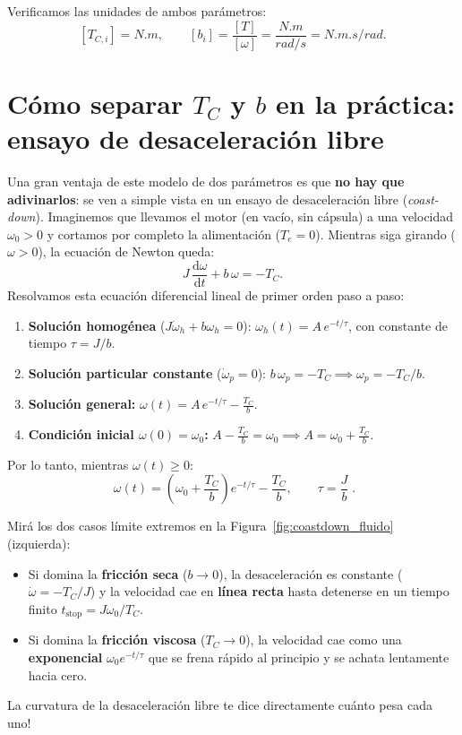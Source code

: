 \documentclass[11pt,a4paper,oneside]{book}
\newcommand{\dd}{\mathrm{d}}
\begin{document}
\begin{unidades}
Verificamos las unidades de ambos parámetros:
\[
  [T_{C,i}] = \si{N.m}, \qquad
  [b_i] = \frac{[T]}{[\omega]} = \frac{\si{N.m}}{\si{rad/s}} = \si{N.m.s/rad}.
\]
\end{unidades}

\section{Cómo separar \texorpdfstring{$T_C$ y $b$}{TC y b} en la práctica: ensayo de desaceleración libre}

Una gran ventaja de este modelo de dos parámetros es que \textbf{no hay que
adivinarlos}: se ven a simple vista en un ensayo de desaceleración libre
(\emph{coast-down}). Imaginemos que llevamos el motor (en vacío, sin cápsula) a
una velocidad $\omega_0 > 0$ y cortamos por completo la alimentación ($T_e = 0$).
Mientras siga girando ($\omega > 0$), la ecuación de Newton queda:
\begin{equation}
  J\,\frac{\dd\omega}{\dd t} + b\,\omega = -T_C.
  \label{eq:edo_coastdown}
\end{equation}
Resolvamos esta ecuación diferencial lineal de primer orden paso a paso:
\begin{enumerate}
  \item \textbf{Solución homogénea} ($J\dot\omega_h + b\omega_h = 0$):
        $\omega_h(t) = A\,e^{-t/\tau}$, con constante de tiempo $\tau = J/b$.
  \item \textbf{Solución particular constante} ($\dot\omega_p = 0$):
        $b\,\omega_p = -T_C \implies \omega_p = -T_C/b$.
  \item \textbf{Solución general:} $\omega(t) = A\,e^{-t/\tau} - \frac{T_C}{b}$.
  \item \textbf{Condición inicial $\omega(0) = \omega_0$:}
        $A - \frac{T_C}{b} = \omega_0 \implies A = \omega_0 + \frac{T_C}{b}$.
\end{enumerate}
Por lo tanto, mientras $\omega(t) \ge 0$:
\begin{equation}
  \boxed{\;\omega(t) = \left(\omega_0 + \frac{T_C}{b}\right)e^{-t/\tau} - \frac{T_C}{b},
  \qquad \tau = \frac{J}{b}\;.}
  \label{eq:sol_coastdown}
\end{equation}

Mirá los dos casos límite extremos en la Figura~\ref{fig:coastdown_fluido}
(izquierda):
\begin{itemize}
  \item Si domina la \textbf{fricción seca} ($b \to 0$), la desaceleración es
        constante ($\dot\omega = -T_C/J$) y la velocidad cae en \textbf{línea
        recta} hasta detenerse en un tiempo finito $t_{\text{stop}} = J\omega_0/T_C$.
  \item Si domina la \textbf{fricción viscosa} ($T_C \to 0$), la velocidad cae
        como una \textbf{exponencial} $\omega_0 e^{-t/\tau}$ que se frena rápido
        al principio y se achata lentamente hacia cero.
\end{itemize}
La curvatura de la desaceleración libre te dice directamente cuánto pesa cada
uno!
\end{document}

